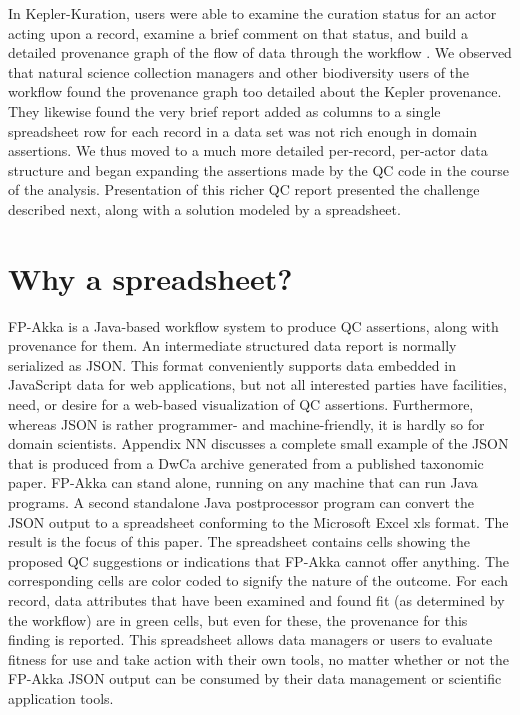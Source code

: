\documentclass{article}
\begin{document}
In Kepler-Kuration, users were able to examine the curation status for an actor acting upon a record, examine a brief comment on that status, and build a detailed 
provenance graph of the flow of data through the workflow \citep{dou_kurator_2012}.   
We observed that natural science collection managers and other biodiversity users of the workflow found the provenance graph too detailed about the Kepler provenance.  They likewise found the very brief report added as columns to a single spreadsheet row for each record in a data set was  not rich enough in domain assertions.  We thus moved to a much more detailed per-record, per-actor data structure and began expanding the assertions made by the QC code in the course of the analysis.  Presentation of this richer QC report presented the challenge described next, along with a solution modeled by a spreadsheet.



\section{Why a spreadsheet?}



FP-Akka is a Java-based workflow system to produce QC assertions, along with provenance for them. 
An intermediate structured data report is normally serialized as JSON.  This format conveniently supports data embedded in JavaScript data for web applications, but not all interested parties have facilities, need, or desire for a web-based visualization of  QC assertions. Furthermore, whereas JSON is rather programmer- and machine-friendly, it is hardly so for domain scientists.  
Appendix NN discusses a complete small example of the JSON that is produced from a DwCa archive generated from a published taxonomic paper.
FP-Akka can stand alone, running on any machine that can run Java programs.  A second standalone Java postprocessor program can convert the JSON output to a spreadsheet conforming to the Microsoft Excel xls format. The result is the focus of this paper.  The spreadsheet contains cells showing the proposed QC suggestions or indications that FP-Akka cannot offer anything.  The corresponding cells are color coded to signify the nature of the outcome.  For each record, data attributes that have been examined and found fit (as determined by the workflow) are in green cells, but even for these, the provenance for this finding is reported. This spreadsheet allows data managers or users to evaluate fitness for use and take action with their own tools, no matter whether or not the FP-Akka JSON output can be consumed by their data management or scientific application tools.
\end{document}
